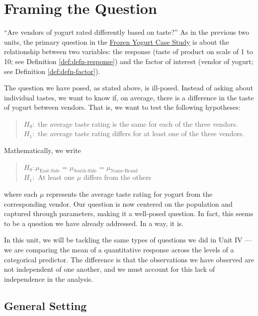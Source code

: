 \documentclass[
]{book}
\theoremstyle{plain}
\theoremstyle{mydefn}
\theoremstyle{myexmpl}
\theoremstyle{remark}
\begin{document}
\hypertarget{Blockquestions}{%
\chapter{Framing the Question}\label{Blockquestions}}

``Are vendors of yogurt rated differently based on taste?'' As in the previous two units, the primary question in the \protect\hyperlink{CaseYogurt}{Frozen Yogurt Case Study} is about the relationship between two variables: the response (taste of product on scale of 1 to 10; see Definition \ref{def:defn-response}) and the factor of interest (vendor of yogurt; see Definition \ref{def:defn-factor}).

The question we have posed, as stated above, is ill-posed. Instead of asking about individual tastes, we want to know if, on average, there is a difference in the taste of yogurt between vendors. That is, we want to test the following hypotheses:

\begin{quote}
\(H_0:\) the average taste rating is the same for each of the three vendors.\\
\(H_1:\) the average taste rating differs for at least one of the three vendors.
\end{quote}

Mathematically, we write

\begin{quote}
\(H_0: \mu_{\text{East-Side}} = \mu_{\text{South-Side}} = \mu_{\text{Name-Brand}}\)\\
\(H_1:\) At least one \(\mu\) differs from the others
\end{quote}

where each \(\mu\) represents the average taste rating for yogurt from the corresponding vendor. Our question is now centered on the population and captured through parameters, making it a well-posed question. In fact, this seems to be a question we have already addressed. In a way, it is.

In this unit, we will be tackling the same types of questions we did in Unit IV --- we are comparing the mean of a quantitative response across the levels of a categorical predictor. The difference is that the observations we have observed are not independent of one another, and we must account for this lack of independence in the analysis.

\hypertarget{general-setting-1}{%
\section{General Setting}\label{general-setting-1}}
\end{document}
